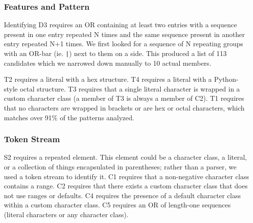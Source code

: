 %





\subsubsection{Features  and Pattern}
Identifying D3 requires an OR containing at least two entries with a sequence present in one entry repeated N times and the same sequence present in another entry repeated N+1 times.  We  first looked for a sequence of N repeating groups with an OR-bar (ie. \verb!|!) next to them on a side.  This produced a list of 113 candidates which we narrowed down manually to 10 actual members.


T2 requires a literal with a hex structure. %
T4 requires a literal with a %
Python-style octal structure. %
T3 requires that a single literal character is wrapped in a custom character class (a member of T3 is always a member of C2).
T1 requires that no characters are wrapped in brackets or are hex or octal characters, which matches over 91\% of the  patterns analyzed.

\subsubsection{Token Stream }
S2 requires a repeated element. This element could be a character class, a literal, or a collection of things encapsulated in parentheses; rather than a parser, we used a token stream to identify it.
C1 requires that a non-negative character class contains a range.
C2 requires that there exists a custom character class that does not use ranges or defaults.
C4 requires the presence of a default character class within a custom character class.
C5 requires an OR of length-one sequences (literal characters or any character class).


